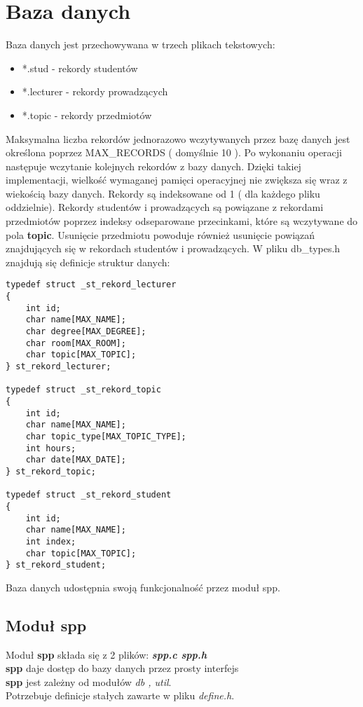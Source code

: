 \documentclass[bibtotocnumbered, headsepline,normalheadings,12pt,polish]{scrreprt}
\begin{document}
\section{Baza danych}
Baza danych jest przechowywana w trzech plikach tekstowych:
\begin{itemize}
\item *.stud - rekordy studentów
\item *.lecturer - rekordy prowadzących
\item *.topic - rekordy przedmiotów
\end{itemize}
Maksymalna liczba rekordów jednorazowo wczytywanych przez bazę danych jest określona poprzez MAX\_RECORDS ( domyślnie 10 ). Po wykonaniu operacji następuje wczytanie kolejnych rekordów z bazy danych. Dzięki takiej implementacji, wielkość wymaganej pamięci operacyjnej nie zwiększa się wraz z wiekością bazy danych.
Rekordy są indeksowane od 1 ( dla każdego pliku oddzielnie). Rekordy studentów i prowadzących są powiązane z rekordami przedmiotów poprzez indeksy odseparowane przecinkami, które są wczytywane do pola \textbf{topic}. Usunięcie przedmiotu powoduje również usunięcie powiązań znajdujących się w rekordach studentów i prowadzących.
W pliku db\_types.h znajdują się definicje struktur danych:
\begin{verbatim}
typedef struct _st_rekord_lecturer
{
    int id;
    char name[MAX_NAME];
    char degree[MAX_DEGREE];
    char room[MAX_ROOM];
    char topic[MAX_TOPIC];
} st_rekord_lecturer;

typedef struct _st_rekord_topic
{
    int id;
    char name[MAX_NAME];
    char topic_type[MAX_TOPIC_TYPE];
    int hours;
    char date[MAX_DATE];
} st_rekord_topic;

typedef struct _st_rekord_student
{
    int id;
    char name[MAX_NAME];
    int index;
    char topic[MAX_TOPIC];
} st_rekord_student;
\end{verbatim}


Baza danych udostępnia swoją funkcjonalność przez moduł spp.
\subsection{Moduł spp}
\large
Moduł \textbf{spp} składa się z 2 plików: \textit{\textbf{spp.c spp.h}}\\
\textbf{spp} daje dostęp do bazy danych przez prosty interfejs\\
\textbf{spp} jest zależny od \large modułów \emph{db , util}.\large\\
Potrzebuje definicje stałych zawarte w pliku \large\emph{define.h}.\large\\
\end{document}
